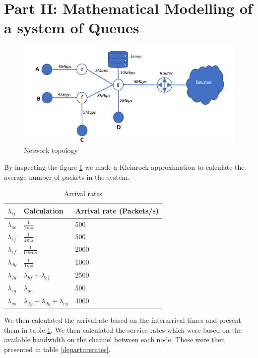 \documentclass{article}
\begin{document}
\section{Part II: Mathematical Modelling of a system of Queues} \label{part2}
\begin{figure}[h!]
  \includegraphics[width=\linewidth]{netmap.png}
  \caption{Network topology}
  \label{fig:netmap}
\end{figure}
By inspecting the figure \ref{fig:netmap} we made a Kleinrock approximation to calculate the average number of packets in the system.
\begin{table}[h]
\centering
\label{Arrivalrates}
\caption{Arrival rates}
\begin{tabular}{|l|l|l|}
\hline
$\lambda_{ij}$ & Calculation & Arrival rate (Packets/s) \\ \hline
$\lambda_{ae}$ & $\frac{1}{2ms}$  & 500 \\ \hline
$\lambda_{bf}$ & $\frac{1}{2ms}$  & 500 \\ \hline
$\lambda_{cf}$ & $\frac{1}{0.5ms}$  & 2000 \\ \hline
$\lambda_{dg}$ & $\frac{1}{1ms}$  & 1000 \\ \hline
$\lambda_{fg}$ & $\lambda_{bf} + \lambda_{cf}$  & 2500  \\ \hline
$\lambda_{eg}$ & $\lambda_{ae}$ & 500 \\ \hline
$\lambda_{gs}$ & $\lambda_{fg} + \lambda_{dg} + \lambda_{eg}$ & 4000 \\ \hline
\end{tabular}
\end{table}
We then calculated the arrivalrate based on the interarrival times and present them in table \ref{Arrivalrates}. We then calculated the service rates which were based on the available bandwidth on the channel between each node. These were then presented in table \ref{departurerates}.
\end{document}
